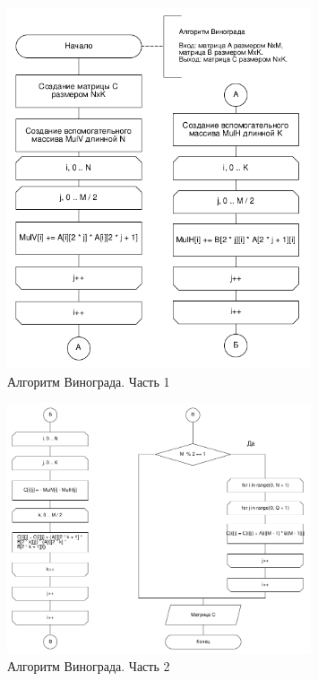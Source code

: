 \begin{figure}[h]
    \centering
    \includegraphics[width=0.8\textwidth]{images/winograd1}
    \caption{Алгоритм Винограда. Часть 1}
    \label{fig:images-winograd1}
\end{figure}

\clearpage

\begin{figure}[h]
    \centering
    \includegraphics[width=0.8\textwidth]{images/winograd2}
    \caption{Алгоритм Винограда. Часть 2}
    \label{fig:images-winograd2}
\end{figure}




